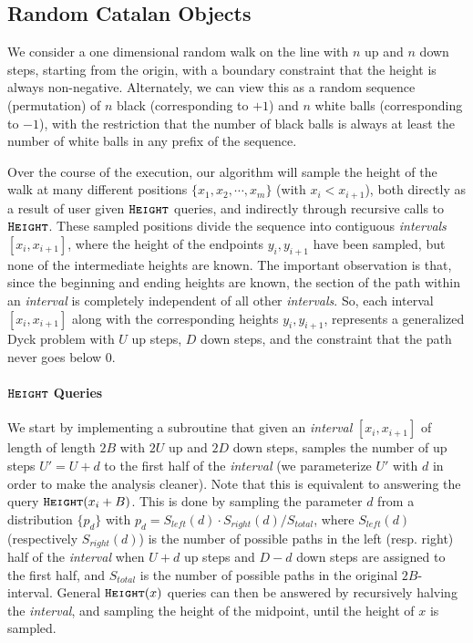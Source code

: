\subsection{Random Catalan Objects}
\label{sec:overview_catalan_objects}
We consider a one dimensional random walk on the line with $n$ up and $n$ down steps, starting from the origin,
with a boundary constraint that the height is always non-negative.
Alternately, we can view this as a random sequence (permutation) of $n$ black (corresponding to $+1$) and $n$ white balls (corresponding to $-1$),
with the restriction that the number of black balls is always at least the number of white balls in any prefix of the sequence.

Over the course of the execution, our algorithm will sample the height of the walk at many different positions $\{ x_1, x_2,\cdots, x_m\}$
(with $x_i<x_{i+1}$), both directly as a result of user given $\texttt{\textsc{Height}}$ queries, and indirectly through recursive calls to $\texttt{\textsc{Height}}$.
These sampled positions divide the sequence into contiguous \emph{intervals} $[x_i,x_{i+1}]$,
where the height of the endpoints $y_i, y_{i+1}$ have been sampled, but none of the intermediate heights are known.
The important observation is that, since the beginning and ending heights are known,
the section of the path within an \emph{interval} is completely independent of all other \emph{intervals}.
So, each interval $[x_i,x_{i+1}]$ along with the corresponding heights $y_i,y_{i+1}$,
represents a generalized Dyck problem with $U$ up steps, $D$ down steps, and the constraint that the path never goes below $0$.

\paragraph*{$\texttt{\textsc{Height}}$ Queries}
\label{par:height_queries}
We start by implementing a subroutine that given an \emph{interval} $[x_i,x_{i+1}]$ of length of length $2B$ with $2U$ up and $2D$ down steps,
samples the number of up steps $U'=U+d$ to the first half of the \emph{interval}
(we parameterize $U'$ with $d$ in order to make the analysis cleaner).
Note that this is equivalent to answering the query $\texttt{\textsc{Height}}(x_i+B)$.
This is done by sampling the parameter $d$ from a distribution $\{ p_d\}$ with $p_d = S_{left}(d)\cdot S_{right}(d)/S_{total}$,
where $S_{left}(d)$ (respectively $S_{right}(d)$) is the number of possible paths in the left (resp. right) half of the \emph{interval} when
$U+d$ up steps and $D-d$ down steps are assigned to the first half, and $S_{total}$ is the number of possible paths in the original $2B$-interval.
General $\texttt{\textsc{Height}}(x)$ queries can then be answered by recursively halving the \emph{interval},
and sampling the height of the midpoint, until the height of $x$ is sampled.

